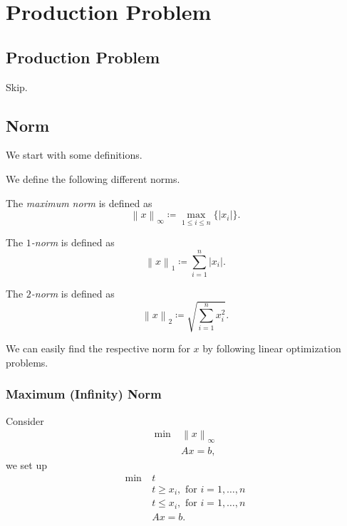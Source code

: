 \chapter{Production Problem}
\section{Production Problem}
Skip.
\section{Norm}
We start with some definitions.
\begin{definition}
	We define the following different norms.
	\begin{definition}\label{def:maximum-norm}
		The \emph{maximum norm} is defined as
		\[
			\left\lVert x\right\rVert_{\infty } \coloneqq \max_{1\leq i \leq n}\{\left\vert x_i \right\vert \}.
		\]
	\end{definition}
	\begin{definition}[\(1\)-norm]\label{def:1-norm}
		The \emph{\(1\)-norm} is defined as
		\[
			\left\lVert x\right\rVert_{1} \coloneqq \sum\limits_{i=1}^{n} \left\vert x_i \right\vert.
		\]
	\end{definition}
	\begin{definition}[\(2\)-norm]\label{def:2-norm}
		The \emph{\(2\)-norm} is defined as
		\[
			\left\lVert x\right\rVert_{2} \coloneqq \sqrt{\sum\limits_{i=1}^{n} x_i^2}.
		\]
	\end{definition}
\end{definition}

We can easily find the respective norm for \(x\) by following linear optimization problems.

\subsection{Maximum (Infinity) Norm}
Consider
\begin{align*}
	\min~ & \left\lVert x\right\rVert_{\infty } \\
	      & Ax = b,
\end{align*}
we set up
\begin{align*}
	\min~ & t                                      \\
	      & t\geq x_i,\text{ for }i = 1, \ldots ,n \\
	      & t\leq x_i,\text{ for }i = 1, \ldots ,n \\
	      & Ax = b.
\end{align*}

